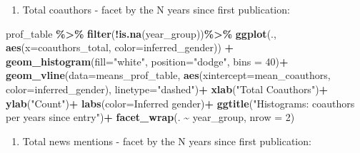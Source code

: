 \documentclass[
]{article}
\newenvironment{Shaded}{\begin{snugshade}}{\end{snugshade}}
\newcommand{\AttributeTok}[1]{\textcolor[rgb]{0.13,0.29,0.53}{#1}}
\newcommand{\DecValTok}[1]{\textcolor[rgb]{0.00,0.00,0.81}{#1}}
\newcommand{\FunctionTok}[1]{\textcolor[rgb]{0.13,0.29,0.53}{\textbf{#1}}}
\newcommand{\NormalTok}[1]{#1}
\newcommand{\SpecialCharTok}[1]{\textcolor[rgb]{0.81,0.36,0.00}{\textbf{#1}}}
\newcommand{\StringTok}[1]{\textcolor[rgb]{0.31,0.60,0.02}{#1}}
\providecommand{\tightlist}{%
  \setlength{\itemsep}{0pt}\setlength{\parskip}{0pt}}
\begin{document}
\begin{enumerate}
\def\labelenumi{\arabic{enumi}.}
\setcounter{enumi}{1}
\tightlist
\item
  Total coauthors - facet by the N years since first publication:
\end{enumerate}

\begin{Shaded}
\begin{Highlighting}[]
\NormalTok{prof\_table }\SpecialCharTok{\%\textgreater{}\%}
  \FunctionTok{filter}\NormalTok{(}\SpecialCharTok{!}\FunctionTok{is.na}\NormalTok{(year\_group))}\SpecialCharTok{\%\textgreater{}\%}
\FunctionTok{ggplot}\NormalTok{(., }\FunctionTok{aes}\NormalTok{(}\AttributeTok{x=}\NormalTok{coauthors\_total, }\AttributeTok{color=}\NormalTok{inferred\_gender)) }\SpecialCharTok{+}
  \FunctionTok{geom\_histogram}\NormalTok{(}\AttributeTok{fill=}\StringTok{"white"}\NormalTok{, }\AttributeTok{position=}\StringTok{"dodge"}\NormalTok{, }\AttributeTok{bins =} \DecValTok{40}\NormalTok{)}\SpecialCharTok{+}
  \FunctionTok{geom\_vline}\NormalTok{(}\AttributeTok{data=}\NormalTok{means\_prof\_table, }\FunctionTok{aes}\NormalTok{(}\AttributeTok{xintercept=}\NormalTok{mean\_coauthors, }\AttributeTok{color=}\NormalTok{inferred\_gender),}
             \AttributeTok{linetype=}\StringTok{"dashed"}\NormalTok{)}\SpecialCharTok{+}
  \FunctionTok{xlab}\NormalTok{(}\StringTok{"Total Coauthors"}\NormalTok{)}\SpecialCharTok{+}
  \FunctionTok{ylab}\NormalTok{(}\StringTok{"Count"}\NormalTok{)}\SpecialCharTok{+}
  \FunctionTok{labs}\NormalTok{(}\AttributeTok{color=}\StringTok{\textquotesingle{}Inferred gender\textquotesingle{}}\NormalTok{)}\SpecialCharTok{+}
  \FunctionTok{ggtitle}\NormalTok{(}\StringTok{"Histograms: coauthors per years since entry"}\NormalTok{)}\SpecialCharTok{+}
  \FunctionTok{facet\_wrap}\NormalTok{(. }\SpecialCharTok{\textasciitilde{}}\NormalTok{ year\_group, }\AttributeTok{nrow =} \DecValTok{2}\NormalTok{)}
\end{Highlighting}
\end{Shaded}

\begin{enumerate}
\def\labelenumi{\arabic{enumi}.}
\setcounter{enumi}{2}
\tightlist
\item
  Total news mentions - facet by the N years since first publication:
\end{enumerate}
\end{document}
